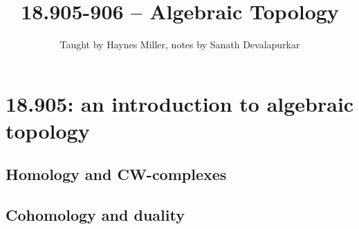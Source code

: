 \documentclass{extbook}
\begin{document}
\title{18.905-906 -- Algebraic Topology}
\author{Taught by Haynes Miller, notes by Sanath Devalapurkar}

\frontmatter

\maketitle

\tableofcontents
\newpage

\mainmatter


\part{18.905: an introduction to algebraic topology}\label{905}

\chapter{Homology and CW-complexes}


























\chapter{Cohomology and duality}













\end{document}
